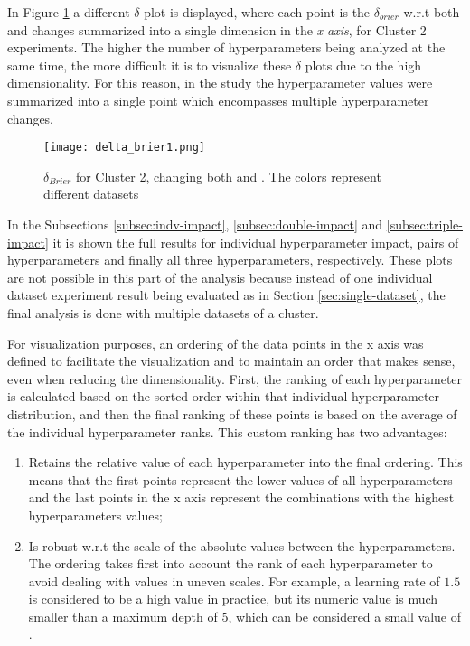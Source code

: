 In Figure \ref{fig:delta-brier1} a different $\delta$ plot is displayed, where each point is the $\delta_{brier}$ w.r.t both  and  changes summarized into a single dimension in the \textit{x axis}, for Cluster 2 experiments. The higher the number of hyperparameters being analyzed at the same time, the more difficult it is to visualize these $\delta$ plots due to the high dimensionality. For this reason, in the study the hyperparameter values were summarized into a single point which encompasses multiple hyperparameter changes.

\begin{figure}[!h]
    \centering
    \texttt{[image: delta\_brier1.png]}
    \caption{$\delta_{Brier}$ for Cluster 2, changing both  and . The colors represent different datasets}
    \label{fig:delta-brier1}
\end{figure}


In the Subsections \ref{subsec:indv-impact}, \ref{subsec:double-impact} and \ref{subsec:triple-impact} it is shown the full results for individual hyperparameter impact, pairs of hyperparameters and finally all three hyperparameters, respectively. These plots are not possible in this part of the analysis because instead of one individual dataset experiment result being evaluated as in Section \ref{sec:single-dataset}, the final analysis is done with multiple datasets of a cluster.

For visualization purposes, an ordering of the data points in the x axis was defined to facilitate the visualization and to maintain an order that makes sense, even when reducing the dimensionality. First, the ranking of each hyperparameter is calculated based on the sorted order within that individual hyperparameter distribution, and then the final ranking of these points is based on the average of the individual hyperparameter ranks. This custom ranking has two advantages:

\begin{enumerate}
    \item Retains the relative value of each hyperparameter into the final ordering. This means that the first points represent the lower values of all hyperparameters and the last points in the x axis represent the combinations with the highest hyperparameters values;
    \item Is robust w.r.t the scale of the absolute values between the hyperparameters. The ordering takes first into account the rank of each hyperparameter to avoid dealing with values in uneven scales. For example, a learning rate of $1.5$ is considered to be a high value in practice, but its numeric value is much smaller than a maximum depth of $5$, which can be considered a small value of .
\end{enumerate}


